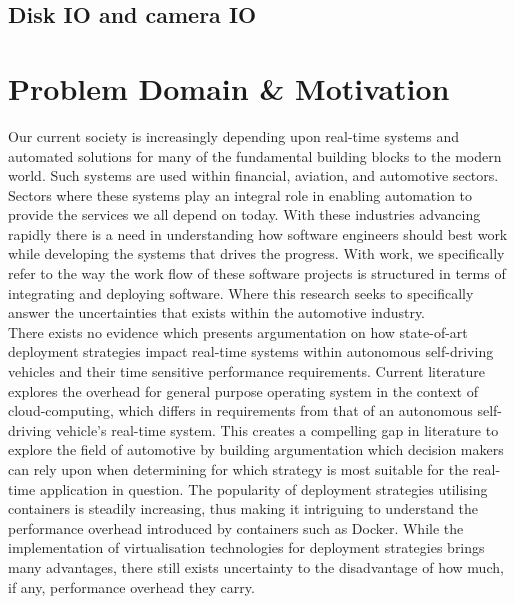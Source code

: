 \subsection{Disk IO and camera IO}



\section{Problem Domain \& Motivation}
Our current society is increasingly depending upon real-time systems and automated solutions for many of the fundamental building blocks to the modern world. Such systems are used within financial, aviation, and automotive sectors. Sectors where these systems play an integral role in enabling automation to provide the services we all depend on today. With these industries advancing rapidly there is a need in understanding how software engineers should best work while developing the systems that drives the progress. With work, we specifically refer to the way the work flow of these software projects is structured in terms of integrating and deploying software. Where this research seeks to specifically answer the uncertainties that exists within the automotive industry. \\

There exists no evidence which presents argumentation on how state-of-art deployment strategies impact real-time systems within autonomous self-driving vehicles and their time sensitive performance requirements. Current literature \cite{vmvscontainers} explores the overhead for general purpose operating system in the context of cloud-computing, which differs in requirements from that of an autonomous self-driving vehicle's real-time system. This creates a compelling gap in literature to explore the field of automotive by building argumentation which decision makers can rely upon when determining for which strategy is most suitable for the real-time application in question. The popularity of deployment strategies utilising containers is steadily increasing, thus making it intriguing to understand the performance overhead introduced by containers such as Docker. While the implementation of virtualisation technologies for deployment strategies brings many advantages, there still exists uncertainty to the disadvantage of how much, if any, performance overhead they carry.\\


